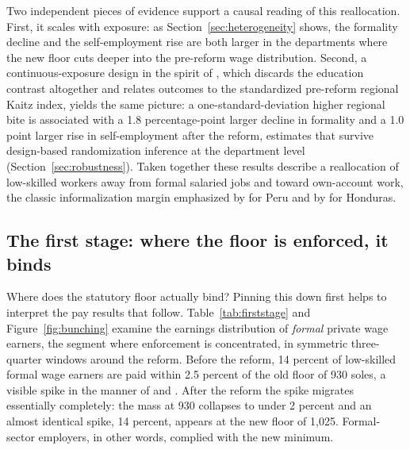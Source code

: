 Two independent pieces of evidence support a causal reading of this reallocation. First,
it scales with exposure: as Section~\ref{sec:heterogeneity} shows, the formality decline
and the self-employment rise are both larger in the departments where the new floor cuts
deeper into the pre-reform wage distribution. Second, a continuous-exposure design in the
spirit of \citet{card_1992}, which discards the education contrast altogether and relates
outcomes to the standardized pre-reform regional Kaitz index, yields the same picture: a
one-standard-deviation higher regional bite is associated with a 1.8 percentage-point
larger decline in formality and a 1.0 point larger rise in self-employment after the
reform, estimates that survive design-based randomization inference at the department
level (Section~\ref{sec:robustness}). Taken together these results describe a
reallocation of low-skilled workers away from formal salaried jobs and toward own-account
work, the classic informalization margin emphasized by \citet{jaramillo_lopez_2006} for
Peru and by \citet{ham_2018_honduras} for Honduras.



\subsection{The first stage: where the floor is enforced, it binds}

Where does the statutory floor actually bind? Pinning this down first helps to
interpret the pay results that follow. Table~\ref{tab:firststage} and Figure~\ref{fig:bunching}
examine the earnings distribution of \emph{formal} private wage earners, the segment
where enforcement is concentrated, in symmetric three-quarter windows around the
reform. Before the reform, 14 percent of low-skilled formal wage earners are paid
within 2.5 percent of the old floor of 930 soles, a visible spike in the manner of
\citet{cengiz_2019} and \citet{engbom_moser_2022}. After the reform the spike
migrates essentially completely: the mass at 930 collapses to under 2 percent and an
almost identical spike, 14 percent, appears at the new floor of 1,025. Formal-sector
employers, in other words, complied with the new minimum.

